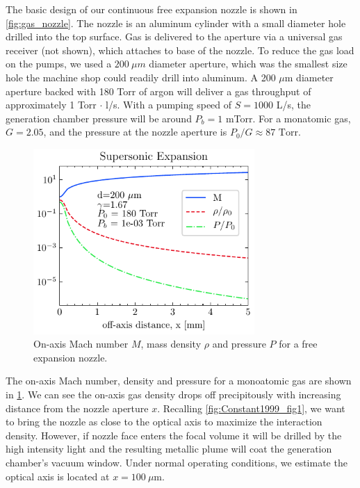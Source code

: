 The basic design of our continuous free expansion nozzle is shown in \cref{fig:gas_nozzle}. The nozzle is an aluminum cylinder with a small diameter hole drilled into the top surface. Gas is delivered to the aperture via a universal gas receiver (not shown), which attaches to base of the nozzle. To reduce the gas load on the pumps, we used a $200 \ \mu m$ diameter aperture, which was the smallest size hole the machine shop could readily drill into aluminum. A 200 $\mu$m diameter aperture backed with 180 Torr of argon will deliver a gas throughput of approximately {1 Torr $\cdot$ l/s}. With a pumping speed of $S = 1000$ L/s, the generation chamber pressure will be around $P_b = 1$ mTorr. For a monatomic gas, $G = 2.05$, and the pressure at the nozzle aperture is $P_0/G \approx 87 \textrm{ Torr}$.

\begin{figure}
	\centering
	\includegraphics[width=0.75\textwidth]{figures/chap3/M_rho_P_vs_x.pdf}
	\caption{On-axis Mach number $M$, mass density $\rho$ and pressure $P$ for a free expansion nozzle.}
	\label{fig:M_rho_vs_x}
\end{figure}


The on-axis Mach number, density and pressure for a monoatomic gas are shown in \cref{fig:M_rho_vs_x}. We can see the on-axis gas density drops off precipitously with increasing distance from the nozzle aperture $x$. Recalling \cref{fig:Constant1999_fig1}, we want to bring the nozzle as close to the optical axis to maximize the interaction density. However, if nozzle face enters the focal volume it will be drilled by the high intensity light and the resulting metallic plume will coat the generation chamber's vacuum window. Under normal operating conditions, we estimate the optical axis is located at $x=100 \ \mu$m.

